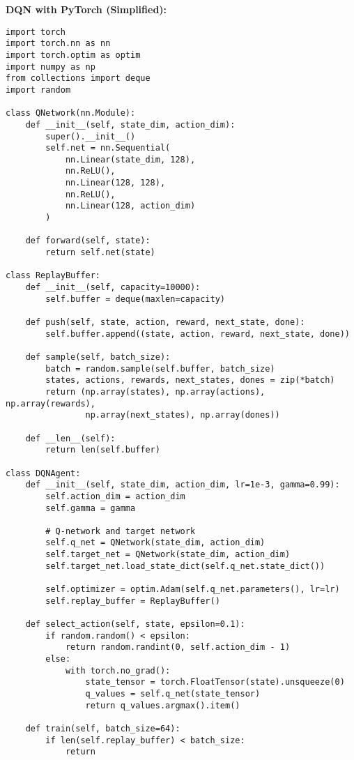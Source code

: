 \begin{codebox}
\textbf{DQN with PyTorch (Simplified):}

\begin{lstlisting}
import torch
import torch.nn as nn
import torch.optim as optim
import numpy as np
from collections import deque
import random

class QNetwork(nn.Module):
    def __init__(self, state_dim, action_dim):
        super().__init__()
        self.net = nn.Sequential(
            nn.Linear(state_dim, 128),
            nn.ReLU(),
            nn.Linear(128, 128),
            nn.ReLU(),
            nn.Linear(128, action_dim)
        )
    
    def forward(self, state):
        return self.net(state)

class ReplayBuffer:
    def __init__(self, capacity=10000):
        self.buffer = deque(maxlen=capacity)
    
    def push(self, state, action, reward, next_state, done):
        self.buffer.append((state, action, reward, next_state, done))
    
    def sample(self, batch_size):
        batch = random.sample(self.buffer, batch_size)
        states, actions, rewards, next_states, dones = zip(*batch)
        return (np.array(states), np.array(actions), np.array(rewards),
                np.array(next_states), np.array(dones))
    
    def __len__(self):
        return len(self.buffer)

class DQNAgent:
    def __init__(self, state_dim, action_dim, lr=1e-3, gamma=0.99):
        self.action_dim = action_dim
        self.gamma = gamma
        
        # Q-network and target network
        self.q_net = QNetwork(state_dim, action_dim)
        self.target_net = QNetwork(state_dim, action_dim)
        self.target_net.load_state_dict(self.q_net.state_dict())
        
        self.optimizer = optim.Adam(self.q_net.parameters(), lr=lr)
        self.replay_buffer = ReplayBuffer()
        
    def select_action(self, state, epsilon=0.1):
        if random.random() < epsilon:
            return random.randint(0, self.action_dim - 1)
        else:
            with torch.no_grad():
                state_tensor = torch.FloatTensor(state).unsqueeze(0)
                q_values = self.q_net(state_tensor)
                return q_values.argmax().item()
    
    def train(self, batch_size=64):
        if len(self.replay_buffer) < batch_size:
            return
        

\end{lstlisting}
\end{codebox}

